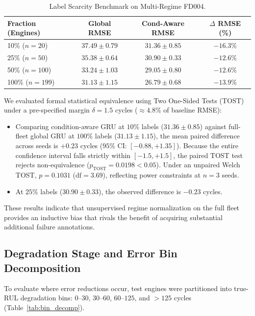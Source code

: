 \documentclass[conference]{IEEEtran}
\begin{document}
\begin{table}[t]
\caption{Label Scarcity Benchmark on Multi-Regime FD004.}
\label{tab:label_efficiency}
\centering
\begin{tabular}{lccc}
\toprule
Fraction (Engines) & Global RMSE & Cond-Aware RMSE & $\Delta$ RMSE (\%) \\
\midrule
10\% ($n=20$) & $37.49 \pm 0.79$ & $\mathbf{31.36 \pm 0.85}$ & $\mathbf{-16.3\%}$ \\
25\% ($n=50$) & $35.38 \pm 0.64$ & $\mathbf{30.90 \pm 0.33}$ & $\mathbf{-12.6\%}$ \\
50\% ($n=100$) & $33.24 \pm 1.03$ & $\mathbf{29.05 \pm 0.80}$ & $\mathbf{-12.6\%}$ \\
100\% ($n=199$) & $31.13 \pm 1.15$ & $\mathbf{26.79 \pm 0.68}$ & $\mathbf{-13.9\%}$ \\
\bottomrule
\end{tabular}
\end{table}

We evaluated formal statistical equivalence using Two One-Sided Tests (TOST)~\cite{schuirmann1987tost, lakens2017tost} under a pre-specified margin $\delta = 1.5$ cycles ($\approx 4.8\%$ of baseline RMSE):
\begin{itemize}
    \item Comparing condition-aware GRU at $10\%$ labels ($31.36 \pm 0.85$) against full-fleet global GRU at $100\%$ labels ($31.13 \pm 1.15$), the mean paired difference across seeds is $+0.23$ cycles ($95\%$ CI: $[-0.88, +1.35]$). Because the entire confidence interval falls strictly within $[-1.5, +1.5]$, the paired TOST test rejects non-equivalence ($p_{\text{TOST}} = 0.0198 < 0.05$). Under an unpaired Welch TOST, $p = 0.1031$ ($\text{df}=3.69$), reflecting power constraints at $n=3$ seeds.
    \item At $25\%$ labels ($30.90 \pm 0.33$), the observed difference is $-0.23$ cycles.
\end{itemize}
These results indicate that unsupervised regime normalization on the full fleet provides an inductive bias that rivals the benefit of acquiring substantial additional failure annotations.

\subsection{Degradation Stage and Error Bin Decomposition}
To evaluate where error reductions occur, test engines were partitioned into true-RUL degradation bins: $0$--$30$, $30$--$60$, $60$--$125$, and $>125$ cycles (Table~\ref{tab:bin_decomp}).
\end{document}
